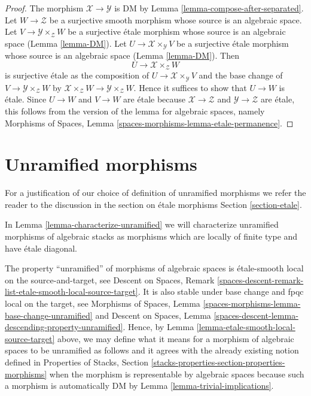 \begin{proof}
The morphism $\mathcal{X} \to \mathcal{Y}$ is DM by
Lemma \ref{lemma-compose-after-separated}.
Let $W \to \mathcal{Z}$ be a surjective smooth morphism
whose source is an algebraic space. Let
$V \to \mathcal{Y} \times_\mathcal{Z} W$ be a surjective
\'etale morphism whose source is an algebraic space
(Lemma \ref{lemma-DM}).
Let $U \to \mathcal{X} \times_\mathcal{Y} V$ be a surjective
\'etale morphism whose source is an algebraic space
(Lemma \ref{lemma-DM}).
Then
$$
U \longrightarrow \mathcal{X} \times_\mathcal{Z} W
$$
is surjective \'etale as the composition of
$U \to \mathcal{X} \times_\mathcal{Y} V$
and the base change of $V \to \mathcal{Y} \times_\mathcal{Z} W$
by $\mathcal{X} \times_\mathcal{Z} W \to \mathcal{Y} \times_\mathcal{Z} W$.
Hence it suffices to show that $U \to W$ is \'etale.
Since $U \to W$ and $V \to W$ are \'etale because
$\mathcal{X} \to \mathcal{Z}$ and $\mathcal{Y} \to \mathcal{Z}$
are \'etale, this follows from the version of the lemma for
algebraic spaces, namely
Morphisms of Spaces, Lemma \ref{spaces-morphisms-lemma-etale-permanence}.
\end{proof}








\section{Unramified morphisms}
\label{section-unramified}

\noindent
For a justification of our choice of definition of
unramified morphisms we refer the reader to the discussion
in the section on \'etale morphisms Section \ref{section-etale}.

\medskip\noindent
In Lemma \ref{lemma-characterize-unramified} we will characterize
unramified morphisms of algebraic stacks as morphisms which are
locally of finite type and have \'etale diagonal.

\medskip\noindent
The property ``unramified'' of morphisms of algebraic spaces
is \'etale-smooth local on the source-and-target, see
Descent on Spaces, Remark
\ref{spaces-descent-remark-list-etale-smooth-local-source-target}.
It is also stable under base change and fpqc local on the target, see
Morphisms of Spaces,
Lemma \ref{spaces-morphisms-lemma-base-change-unramified}
and
Descent on Spaces,
Lemma \ref{spaces-descent-lemma-descending-property-unramified}.
Hence, by
Lemma \ref{lemma-etale-smooth-local-source-target}
above, we may define what it means for a morphism of algebraic spaces
to be unramified as follows and it agrees with the already existing notion
defined in Properties of Stacks, Section
\ref{stacks-properties-section-properties-morphisms}
when the morphism is representable by algebraic spaces
because such a morphism is automatically DM by
Lemma \ref{lemma-trivial-implications}.

